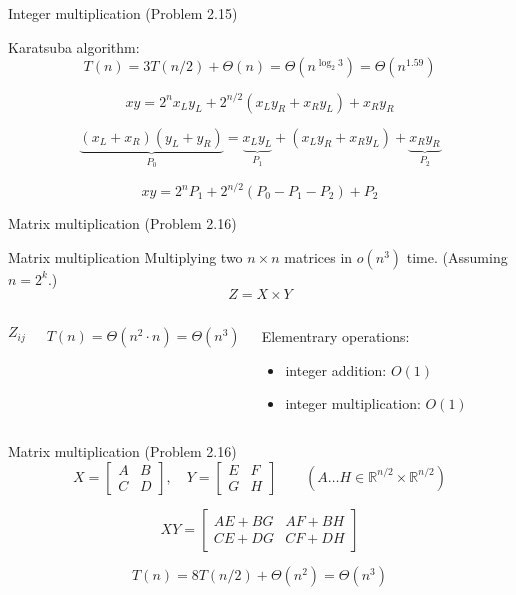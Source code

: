 \begin{frame}{Integer multiplication (Problem 2.15)}
  \begin{block}{Karatsuba algorithm:}
    \[
      T(n) = 3T(n/2) + \Theta(n) = \Theta(n^{\log_{2}{3}}) = \Theta(n^{1.59})
    \]

	\pause

	\[
      xy = 2^{n} x_L y_L + 2^{n/2} (x_L y_R + x_R y_L) + x_R y_R
	\]
	
    \[
      \underbrace{(x_L + x_R) (y_L + y_R)}_{P_0} = \underbrace{x_L y_L}_{P_1} +
      (x_L y_R + x_R y_L) + \underbrace{x_R y_R}_{P_2}
    \]

    \[
      xy = 2^{n} P_1 + 2^{n/2} (P_0 - P_1 - P_2) + P_2
    \]
  \end{block}
\end{frame}
\begin{frame}{Matrix multiplication (Problem 2.16)}
  \begin{exampleblock}{Matrix multiplication}
    Multiplying two $n \times n$ matrices in $o(n^3)$ time. {\small (Assuming $n = 2^k$.)}
    \[ Z = X \times Y \]
  \end{exampleblock}

  \vspace{0.50cm}
  \begin{columns}
	  \[ Z_{ij} \]

	  \[ T(n) = \Theta(n^2 \cdot n) = \Theta(n^3) \]
	  \begin{block}{Elementrary operations:}
	    \begin{itemize}
	      \item integer addition: $O(1)$
	      \item integer multiplication: $O(1)$
	    \end{itemize}
	  \end{block}
  \end{columns}
\end{frame}
\begin{frame}{Matrix multiplication (Problem 2.16)}
  \begin{displaymath}
	X = \begin{bmatrix} A & B \\ C & D \end{bmatrix}, \quad
	Y = \begin{bmatrix} E & F \\ G & H \end{bmatrix} \qquad (A \ldots H \in
	\mathbb{R}^{n/2} \times \mathbb{R}^{n/2})
  \end{displaymath}

  \[
    XY = \begin{bmatrix} AE + BG & AF + BH \\ CE + DG & CF + DH \end{bmatrix}
  \]

  \[
    T(n) = 8T(n/2) + \Theta(n^2) = \Theta(n^3)
  \]
\end{frame}
